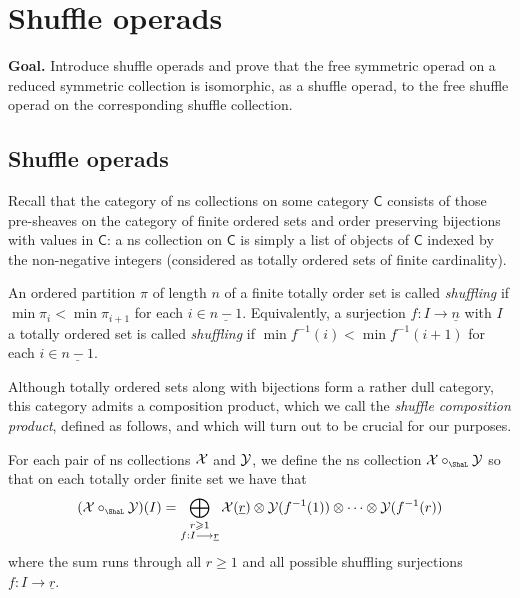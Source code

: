 \section{Shuffle operads}\label{lecture:shuffleops}

\textbf{Goal.} Introduce shuffle operads
and prove that the free symmetric operad
on a reduced symmetric collection is
isomorphic, as a shuffle operad,
to the free shuffle operad on the
corresponding shuffle collection. 

\subsection{Shuffle operads}

Recall that the category of ns collections
on some category $\mathsf{C}$ 
consists of those pre-sheaves on
the category of finite ordered sets
and order preserving bijections with
values in $\mathsf{C}$: a ns collection
on $\mathsf{C}$ is simply a list of
objects of $\mathsf{C}$ indexed by
the non-negative integers (considered
as totally ordered sets of finite 
cardinality). 

\begin{definition}
An ordered partition $\pi$ of length $n$
of a finite totally order 
set is called \emph{shuffling} if
$\min \pi_i < \min \pi_{i+1}$ for
each $i\in \underline{n-1}$. Equivalently, 
a surjection $f:I\longrightarrow \underline{n}$
with $I$ a totally ordered set
is called \emph{shuffling} if
$\min f^{-1}(i) < \min f^{-1}(i+1)$
for each $i\in \underline{n-1}$.
\end{definition}

Although totally ordered
sets along with bijections form a rather
dull category, this category
admits a composition product, which we call
the \emph{shuffle composition product},
defined as follows, and which will turn
out to be crucial for our purposes.

\begin{definition}
For each pair of ns collections $\mathcal{X}$
and $\mathcal{Y}$, we define the ns collection
$\XX\circ_{\Sha} \YY$ so that on each
totally order finite set we have that 
\[
(\XX\circ_{\Sha} \YY)(I)
	=
	 \bigoplus_{\substack{r\geqslant 1
	 	\\ f: I \longrightarrow \underline{r}}}
	 \XX(\underline{r})\otimes 
	 \YY(f^{-1}(1))
	 	\otimes
	 		\cdots
	 			\otimes
	 				\YY(f^{-1}(r))
\]
where the sum runs through all $r\geqslant 1$
and all possible 
shuffling surjections 
$f : I \longrightarrow \underline{r}$.
\end{definition}

